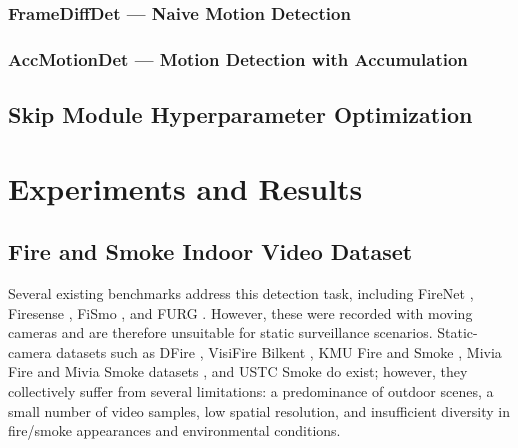 \documentclass[
  10pt,
]{article}
\begin{document}
\subsubsection{FrameDiffDet --- Naive Motion
Detection}\label{framediffdet-naive-motion-detection}



\subsubsection{AccMotionDet --- Motion Detection with
Accumulation}\label{accmotiondet-motion-detection-with-accumulation}



\subsection{Skip Module Hyperparameter
Optimization}\label{sec:hyperparam}



\section{Experiments and Results}\label{sec:results}

\subsection{Fire and Smoke Indoor Video
Dataset}\label{fire-and-smoke-indoor-video-dataset}



 

Several existing benchmarks address this detection task, including
FireNet , Firesense
, FiSmo
, and FURG
. However, these were
recorded with moving cameras and are therefore unsuitable for static
surveillance scenarios. Static-camera datasets such as DFire
, VisiFire Bilkent
, KMU Fire and Smoke
, Mivia Fire and Mivia Smoke
datasets , and USTC Smoke
 do exist; however, they
collectively suffer from several limitations: a predominance of outdoor
scenes, a small number of video samples, low spatial resolution, and
insufficient diversity in fire/smoke appearances and environmental
conditions.
\end{document}
